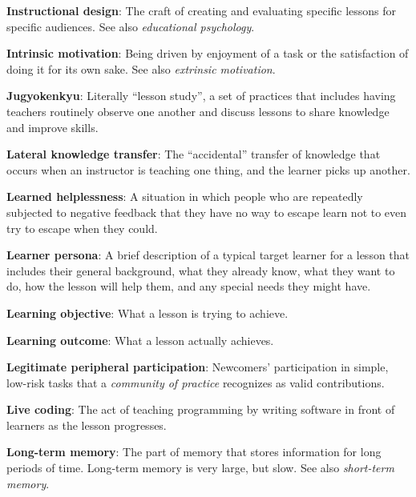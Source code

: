 \textbf{\hypertarget{g:instructional-design}{Instructional design}\label{g:instructional-design}}: The craft of
creating and evaluating specific lessons for specific audiences. See
also \emph{educational psychology}.

\textbf{\hypertarget{g:intrinsic-motivation}{Intrinsic motivation}\label{g:intrinsic-motivation}}: Being driven
by enjoyment of a task or the satisfaction of doing it for its own sake.
See also \emph{extrinsic motivation}.

\textbf{\hypertarget{g:jugyokenkyu}{Jugyokenkyu}\label{g:jugyokenkyu}}: Literally ``lesson study'', a set
of practices that includes having teachers routinely observe one another
and discuss lessons to share knowledge and improve skills.

\textbf{\hypertarget{g:lateral-knowledge-transfer}{Lateral knowledge transfer}\label{g:lateral-knowledge-transfer}}:
The ``accidental'' transfer of knowledge that occurs when an instructor is
teaching one thing, and the learner picks up another.

\textbf{\hypertarget{g:learned-helplessness}{Learned helplessness}\label{g:learned-helplessness}}: A situation
in which people who are repeatedly subjected to negative feedback that
they have no way to escape learn not to even try to escape when they
could.

\textbf{\hypertarget{g:learner-persona}{Learner persona}\label{g:learner-persona}}: A brief description of
a typical target learner for a lesson that includes their general
background, what they already know, what they want to do, how the lesson
will help them, and any special needs they might have.

\textbf{\hypertarget{g:learning-objective}{Learning objective}\label{g:learning-objective}}: What a lesson is
trying to achieve.

\textbf{\hypertarget{g:learning-outcome}{Learning outcome}\label{g:learning-outcome}}: What a lesson
actually achieves.

\textbf{\hypertarget{g:legitimate-peripheral-participation}{Legitimate peripheral participation}\label{g:legitimate-peripheral-participation}}:
Newcomers' participation in simple, low-risk tasks that a \emph{community
of practice} recognizes as valid contributions.

\textbf{\hypertarget{g:live-coding}{Live coding}\label{g:live-coding}}: The act of teaching programming
by writing software in front of learners as the lesson progresses.

\textbf{\hypertarget{g:long-term-memory}{Long-term memory}\label{g:long-term-memory}}: The part of memory
that stores information for long periods of time. Long-term memory is
very large, but slow. See also \emph{short-term memory}.

